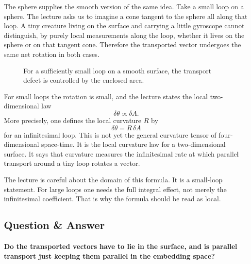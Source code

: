The sphere supplies the smooth version of the same idea. Take a small loop on a sphere. The lecture asks us to imagine a cone tangent to the sphere all along that loop. A tiny creature living on the surface and carrying a little gyroscope cannot distinguish, by purely local measurements along the loop, whether it lives on the sphere or on that tangent cone. Therefore the transported vector undergoes the same net rotation in both cases.

\begin{figure}[h]
\centering
{}%
\caption{For a sufficiently small loop on a smooth surface, the transport defect is controlled by the enclosed area.}
\end{figure}

For small loops the rotation is small, and the lecture states the local two-dimensional law
\begin{equation}
\delta\theta \propto \delta A.
\end{equation}
More precisely, one defines the local curvature \(R\) by
\begin{equation}
\delta\theta=R\,\delta A
\end{equation}
for an infinitesimal loop. This is not yet the general curvature tensor of four-dimensional space-time. It is the local curvature law for a two-dimensional surface. It says that curvature measures the infinitesimal rate at which parallel transport around a tiny loop rotates a vector.

The lecture is careful about the domain of this formula. It is a small-loop statement. For large loops one needs the full integral effect, not merely the infinitesimal coefficient. That is why the formula should be read as local.

\subsection{Question \& Answer}

\paragraph{Do the transported vectors have to lie in the surface, and is parallel transport just keeping them parallel in the embedding space?}

